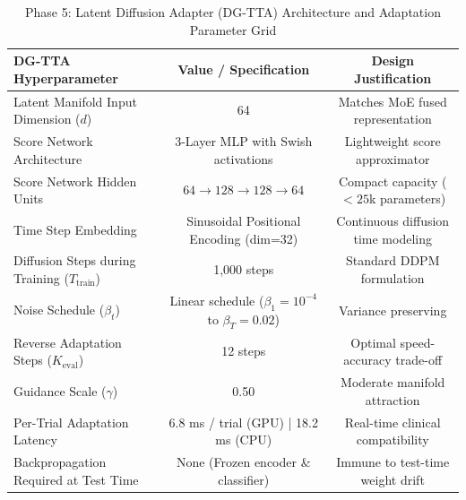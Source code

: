 \begin{table}[t]
\centering
\caption{Phase 5: Latent Diffusion Adapter (DG-TTA) Architecture and Adaptation Parameter Grid}
\label{tab:phase5_diffusion_specs}
\begin{tabular}{lcc}
\hline
\textbf{DG-TTA Hyperparameter} & \textbf{Value / Specification} & \textbf{Design Justification} \\
\hline
Latent Manifold Input Dimension ($d$) & 64 & Matches MoE fused representation \\
Score Network Architecture & 3-Layer MLP with Swish activations & Lightweight score approximator \\
Score Network Hidden Units & $64 \rightarrow 128 \rightarrow 128 \rightarrow 64$ & Compact capacity ($<25$k parameters) \\
Time Step Embedding & Sinusoidal Positional Encoding (dim=32) & Continuous diffusion time modeling \\
Diffusion Steps during Training ($T_{\text{train}}$) & 1,000 steps & Standard DDPM formulation \\
Noise Schedule ($\beta_t$) & Linear schedule ($\beta_1=10^{-4}$ to $\beta_T=0.02$) & Variance preserving \\
Reverse Adaptation Steps ($K_{\text{eval}}$) & 12 steps & Optimal speed-accuracy trade-off \\
Guidance Scale ($\gamma$) & 0.50 & Moderate manifold attraction \\
Per-Trial Adaptation Latency & 6.8 ms / trial (GPU) | 18.2 ms (CPU) & Real-time clinical compatibility \\
Backpropagation Required at Test Time & None (Frozen encoder \& classifier) & Immune to test-time weight drift \\
\hline
\end{tabular}
\end{table}